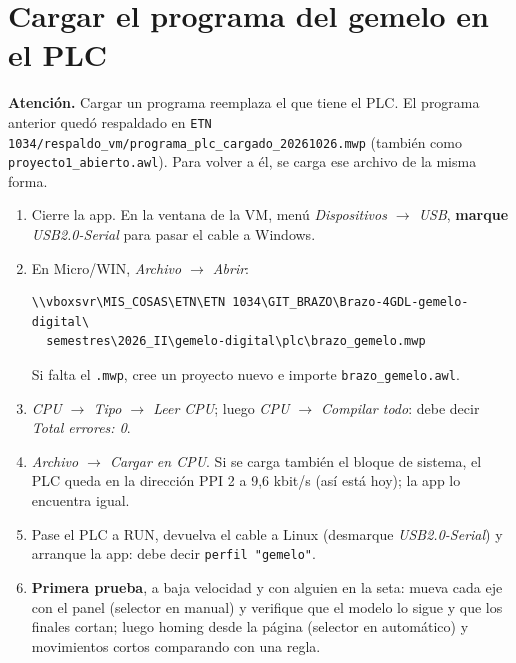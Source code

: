 \documentclass[a4paper,11pt]{article}
\newcommand{\codigo}[1]{\texttt{#1}}
\newcommand{\aviso}[1]{\par\smallskip\noindent\colorbox{rojo!10}{\parbox{\dimexpr\linewidth-2\fboxsep}{\textbf{\color{rojo}Atención.} #1}}\par\smallskip}
\begin{document}
\section{Cargar el programa del gemelo en el PLC}
\aviso{Cargar un programa reemplaza el que tiene el PLC. El programa anterior quedó respaldado en \codigo{ETN 1034/respaldo\_vm/programa\_plc\_cargado\_20261026.mwp} (también como \codigo{proyecto1\_abierto.awl}). Para volver a él, se carga ese archivo de la misma forma.}
\begin{enumerate}
\item Cierre la app. En la ventana de la VM, menú \emph{Dispositivos $\rightarrow$ USB}, \textbf{marque} \emph{USB2.0-Serial} para pasar el cable a Windows.
\item En Micro/WIN, \emph{Archivo $\rightarrow$ Abrir}:
\begin{lstlisting}
\\vboxsvr\MIS_COSAS\ETN\ETN 1034\GIT_BRAZO\Brazo-4GDL-gemelo-digital\
  semestres\2026_II\gemelo-digital\plc\brazo_gemelo.mwp
\end{lstlisting}
Si falta el \codigo{.mwp}, cree un proyecto nuevo e importe \codigo{brazo\_gemelo.awl}.
\item \emph{CPU $\rightarrow$ Tipo $\rightarrow$ Leer CPU}; luego \emph{CPU $\rightarrow$ Compilar todo}: debe decir \emph{Total errores: 0}.
\item \emph{Archivo $\rightarrow$ Cargar en CPU}. Si se carga también el bloque de sistema, el PLC queda en la dirección PPI 2 a 9,6 kbit/s (así está hoy); la app lo encuentra igual.
\item Pase el PLC a RUN, devuelva el cable a Linux (desmarque \emph{USB2.0-Serial}) y arranque la app: debe decir \codigo{perfil "gemelo"}.
\item \textbf{Primera prueba}, a baja velocidad y con alguien en la seta: mueva cada eje con el panel (selector en manual) y verifique que el modelo lo sigue y que los finales cortan; luego homing desde la página (selector en automático) y movimientos cortos comparando con una regla.
\end{enumerate}

\end{document}

